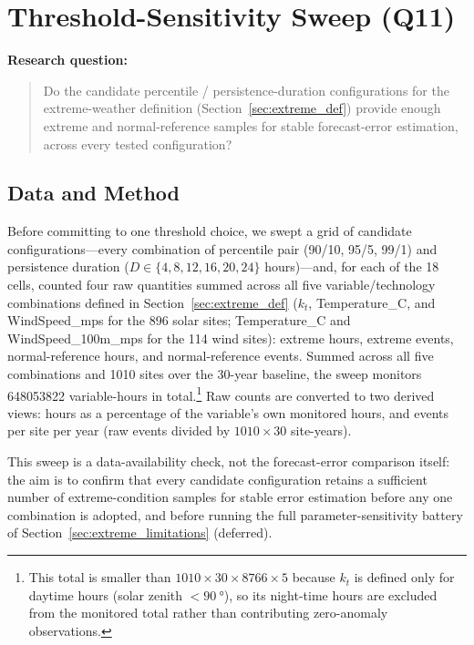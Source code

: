\section{Threshold-Sensitivity Sweep (Q11)}\label{sec:extreme_sensitivity}

\textbf{Research question:}

\begin{quote}
Do the candidate percentile / persistence-duration configurations for the extreme-weather
definition (Section~\ref{sec:extreme_def}) provide enough extreme and normal-reference samples for
stable forecast-error estimation, across every tested configuration?
\end{quote}

\subsection{Data and Method}

Before committing to one threshold choice, we swept a grid of candidate configurations---every
combination of percentile pair (90/10, 95/5, 99/1) and persistence duration
($D \in \{4,8,12,16,20,24\}$ hours)---and, for each of the 18 cells, counted four raw quantities
summed across all five variable/technology combinations defined in Section~\ref{sec:extreme_def}
($k_t$, Temperature\_C, and WindSpeed\_mps for the \num{896} solar sites; Temperature\_C and
WindSpeed\_100m\_mps for the \num{114} wind sites): extreme hours, extreme events, normal-reference
hours, and normal-reference events. Summed across all five combinations and \num{1010} sites over
the 30-year baseline, the sweep monitors \num{648053822} variable-hours in total.\footnote{This
total is smaller than $1010\times30\times8766\times5$ because $k_t$ is defined only for daytime
hours (solar zenith $<\SI{90}{\degree}$), so its night-time hours are excluded from the monitored
total rather than contributing zero-anomaly observations.} Raw counts are converted to two derived
views: hours as a percentage of the variable's own monitored hours, and events per site per year
(raw events divided by $\num{1010}\times\num{30}$ site-years).

This sweep is a data-availability check, not the forecast-error comparison itself: the aim is to
confirm that every candidate configuration retains a sufficient number of extreme-condition
samples for stable error estimation before any one combination is adopted, and before running the
full parameter-sensitivity battery of Section~\ref{sec:extreme_limitations} (deferred).

